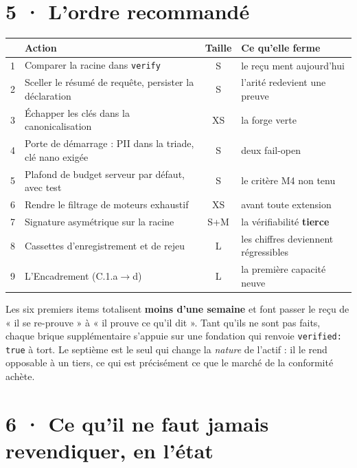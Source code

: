 \documentclass[10pt]{article}
\newcommand{\sz}[1]{{\small\color{grey}\textsf{#1}}}
\newcommand{\code}[1]{\texttt{\small #1}}
\begin{document}
\section{5 · L'ordre recommandé}

\begin{center}\small
\begin{tabular}{@{}r>{\raggedright\arraybackslash}p{9.5cm}c>{\raggedright\arraybackslash}p{3.9cm}@{}}
\toprule
& \textbf{Action} & \textbf{Taille} & \textbf{Ce qu'elle ferme} \\
\midrule
1 & Comparer la racine dans \code{verify} & \sz{S} & le reçu ment aujourd'hui \\
2 & Sceller le résumé de requête, persister la déclaration & \sz{S} & l'arité redevient une preuve \\
3 & Échapper les clés dans la canonicalisation & \sz{XS} & la forge verte \\
4 & Porte de démarrage : PII dans la triade, clé nano exigée & \sz{S} & deux fail-open \\
5 & Plafond de budget serveur par défaut, avec test & \sz{S} & le critère M4 non tenu \\
6 & Rendre le filtrage de moteurs exhaustif & \sz{XS} & avant toute extension \\
\midrule
7 & Signature asymétrique sur la racine & \sz{S+M} & la vérifiabilité \textbf{tierce} \\
8 & Cassettes d'enregistrement et de rejeu & \sz{L} & les chiffres deviennent régressibles \\
9 & L'Encadrement (C.1.a$\rightarrow$d) & \sz{L} & la première capacité neuve \\
\bottomrule
\end{tabular}
\end{center}

Les six premiers items totalisent \textbf{moins d'une semaine} et font passer le reçu de « il se
re-prouve » à « il prouve ce qu'il dit ». Tant qu'ils ne sont pas faits, chaque brique supplémentaire
s'appuie sur une fondation qui renvoie \code{verified: true} à tort. Le septième est le seul qui change
la \emph{nature} de l'actif : il le rend opposable à un tiers, ce qui est précisément ce que le marché
de la conformité achète.

\enlargethispage{3.2\baselineskip}
\section{6 · Ce qu'il ne faut jamais revendiquer, en l'état}
\end{document}

